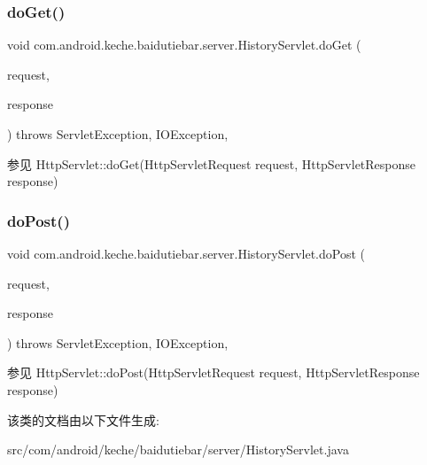 \subsubsection{\texorpdfstring{do\+Get()}{doGet()}}
{\footnotesize\ttfamily void com.\+android.\+keche.\+baidutiebar.\+server.\+History\+Servlet.\+do\+Get (\begin{DoxyParamCaption}\item[{Http\+Servlet\+Request}]{request,  }\item[{Http\+Servlet\+Response}]{response }\end{DoxyParamCaption}) throws Servlet\+Exception, I\+O\+Exception\hspace{0.3cm}{\ttfamily [inline]}, {\ttfamily [protected]}}

\begin{DoxySeeAlso}{参见}
Http\+Servlet\+::do\+Get(\+Http\+Servlet\+Request request, Http\+Servlet\+Response response) 
\end{DoxySeeAlso}
\mbox{\label{classcom_1_1android_1_1keche_1_1baidutiebar_1_1server_1_1_history_servlet_aa5f065d950c5794b099a4106592862b5}} 
\subsubsection{\texorpdfstring{do\+Post()}{doPost()}}
{\footnotesize\ttfamily void com.\+android.\+keche.\+baidutiebar.\+server.\+History\+Servlet.\+do\+Post (\begin{DoxyParamCaption}\item[{Http\+Servlet\+Request}]{request,  }\item[{Http\+Servlet\+Response}]{response }\end{DoxyParamCaption}) throws Servlet\+Exception, I\+O\+Exception\hspace{0.3cm}{\ttfamily [inline]}, {\ttfamily [protected]}}

\begin{DoxySeeAlso}{参见}
Http\+Servlet\+::do\+Post(\+Http\+Servlet\+Request request, Http\+Servlet\+Response response) 
\end{DoxySeeAlso}


该类的文档由以下文件生成\+:\begin{DoxyCompactItemize}
\item 
src/com/android/keche/baidutiebar/server/History\+Servlet.\+java\end{DoxyCompactItemize}
